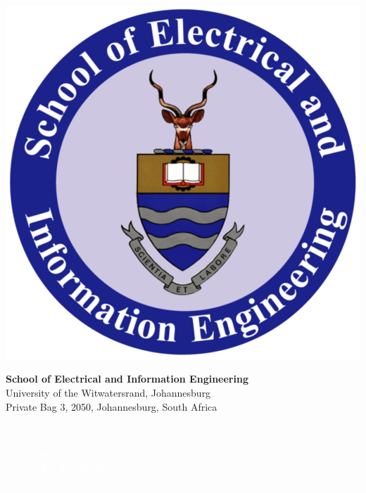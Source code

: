 \documentclass[11pt]{article}
\begin{document}
\pagestyle{empty}
\begin{minipage}{0.18\textwidth}
    \includegraphics[width=\textwidth,height=\textwidth]{images/eie.png}
\end{minipage}
\begin{minipage}{0.8\textwidth}
    \centering
    \textbf{\Large School of Electrical and Information Engineering}\\
    {\large University of the Witwatersrand, Johannesburg}\\
    {\small Private Bag 3, 2050, Johannesburg, South Africa}\\
\end{minipage}
\vspace{.3cm}\\
\colorbox{myblue}{\begin{minipage}{0.98\textwidth}
        \begin{center}
            \textcolor{white}{\textbf{\Large{ELEN4017: Project - 2017}}\\
                \textbf{Networks:  Email Application System}\\
                May 2017
            }
        \end{center}
    \end{minipage}
}
\\
\vspace{6cm}
\end{document}
